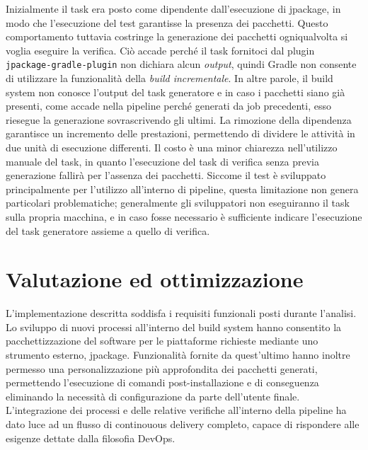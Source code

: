 Inizialmente il task era posto come dipendente dall'esecuzione di jpackage, in modo che l'esecuzione del test garantisse la presenza dei pacchetti. Questo comportamento tuttavia costringe la generazione dei pacchetti ogniqualvolta si voglia eseguire la verifica. Ciò accade perché il task fornitoci dal plugin \texttt{jpackage-gradle-plugin} non dichiara alcun \textit{output}, quindi Gradle non consente di utilizzare la funzionalità della \textit{build incrementale}. In altre parole, il build system non conosce l'output del task generatore e in caso i pacchetti siano già presenti, come accade nella pipeline perché generati da job precedenti, esso riesegue la generazione sovrascrivendo gli ultimi. La rimozione della dipendenza garantisce un incremento delle prestazioni, permettendo di dividere le attività in due unità di esecuzione differenti. Il costo è una minor chiarezza nell'utilizzo manuale del task, in quanto l'esecuzione del task di verifica senza previa generazione fallirà per l'assenza dei pacchetti. Siccome il test è sviluppato principalmente per l'utilizzo all'interno di pipeline, questa limitazione non genera particolari problematiche; generalmente gli sviluppatori non eseguiranno il task sulla propria macchina, e in caso fosse necessario è sufficiente indicare l'esecuzione del task generatore assieme a quello di verifica.

\section{Valutazione ed ottimizzazione}

L'implementazione descritta soddisfa i requisiti funzionali posti durante l'analisi. Lo sviluppo di nuovi processi all'interno del build system hanno consentito la pacchettizzazione del software per le piattaforme richieste mediante uno strumento esterno, jpackage. Funzionalità fornite da quest'ultimo hanno inoltre permesso una personalizzazione più approfondita dei pacchetti generati, permettendo l'esecuzione di comandi post-installazione e di conseguenza eliminando la necessità di configurazione da parte dell'utente finale. L'integrazione dei processi e delle relative verifiche all'interno della pipeline ha dato luce ad un flusso di continouous delivery completo, capace di rispondere alle esigenze dettate dalla filosofia DevOps.

